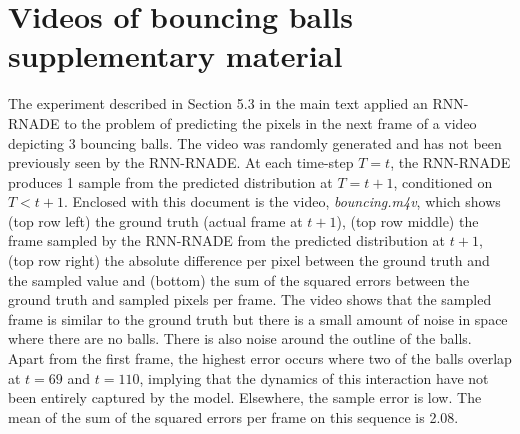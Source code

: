 \documentclass{article} %
\begin{document}
 \section{Videos of bouncing balls supplementary material}
The experiment described in Section 5.3 in the main text applied an RNN-RNADE to the problem of predicting the pixels in the next frame of a video depicting 3 bouncing balls. The video was randomly generated and has not been previously seen by the RNN-RNADE. At each time-step \(T=t\), the RNN-RNADE produces 1 sample from the predicted distribution at \(T=t+1\), conditioned on \(T<t+1\). Enclosed with this document is the video, {\it bouncing.m4v}, which shows (top row left) the ground truth (actual frame at \(t+1\)), (top row middle) the frame sampled by the RNN-RNADE from the predicted distribution at  \(t+1\), (top row right) the absolute difference per pixel between the ground truth and the sampled value and (bottom) the sum of the squared errors between the ground truth and sampled pixels per frame. The video shows that the sampled frame is similar to the ground truth but there is a small amount of noise in space where there are no balls. There is also noise around the outline of the balls. Apart from the first frame, the highest error occurs where two of the balls overlap at \(t=69\) and \(t=110\), implying that the dynamics of this interaction have not been entirely captured by the model. Elsewhere, the sample error is low. The mean of the sum of the squared errors per frame on this sequence is 2.08. 



\end{document}
